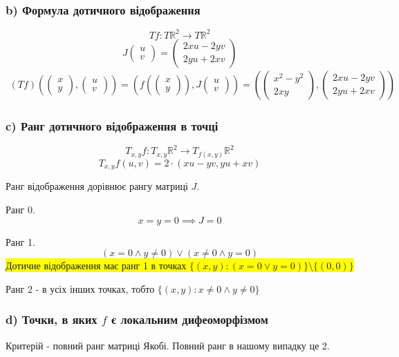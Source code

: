 \documentclass[10pt, a4paper]{article} %
\newcommand{\R}{\mathbb{R}}
\begin{document}
\subsubsection*{b) Формула дотичного відображення}
\[Tf : T\R^2 \to T\R^2\]
\[J\begin{pmatrix}u\\v\end{pmatrix} = \begin{pmatrix}2xu-2yv\\2yu+2xv\end{pmatrix}\]
\begin{align*}
    (Tf)\left(\begin{pmatrix}x\\y\end{pmatrix} , \begin{pmatrix}u\\v\end{pmatrix}\right)
    = \left(f(\begin{pmatrix}x\\y\end{pmatrix}) , J\begin{pmatrix}u\\v\end{pmatrix}\right)
    = \left(\begin{pmatrix}x^2-y^2 \\ 2xy\end{pmatrix} , \begin{pmatrix}2xu-2yv\\2yu+2xv\end{pmatrix}\right)
\end{align*}

\subsubsection*{c) Ранг дотичного відображення в точці}
\[T_{x,y}f : T_{x,y}\R^2 \to T_{f(x,y)}\R^2\]
\[T_{x,y}f(u,v) = 2\cdot (xu-yv, yu+xv)\]

Ранг відображення дорівнює рангу матриці $J$.

Ранг 0.
\[x=y=0 \implies J=0\]

Ранг 1.
\[(x=0 \land y\ne 0) \vee (x\ne 0 \land y=0)\]
\colorbox{yellow}{Дотичне відображення має ранг 1 в точках $\{(x,y) : (x=0 \vee y=0) \} \setminus \{(0,0)\}$}

Ранг 2 - в усіх інших точках, тобто $\{(x,y) : x\ne 0 \land y \ne 0\}$

\subsubsection*{d) Точки, в яких $f$ є локальним дифеоморфізмом}
Критерій - повний ранг матриці Якобі.
Повний ранг в нашому випадку це 2.
\end{document}
